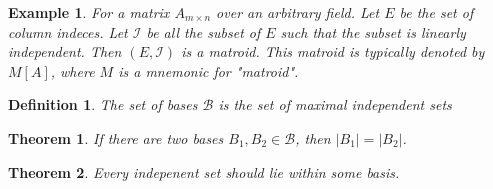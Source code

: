 \documentclass[11pt]{book}
\newcommand{\I}{\ensuremath{\mathcal{I}} }
\newcommand{\B}{\ensuremath{\mathcal{B}} }
\newtheorem{theorem}{Theorem}
\newtheorem{definition}{Definition}
\newtheorem{example}{Example}
\begin{document}
\begin{example}
    For a matrix $A_{m \times n}$ over an arbitrary field. Let $E$ be the set
    of column indeces. Let $\I$ be all the subset of $E$ such that the subset 
    is linearly independent. Then $(E, \I)$ is a matroid. This matroid is typically
    denoted by $M[A]$, where $M$ is a mnemonic for "matroid".
\end{example}

\begin{definition}
    The set of bases $\B$ is the set of maximal independent sets
\end{definition}

\begin{theorem}
    If there are two bases $B_1, B_2 \in \B$, then $|B_1| = |B_2|$.
\end{theorem}

\begin{theorem}
    Every indepenent set should lie within some basis.
\end{theorem}
\end{document}
